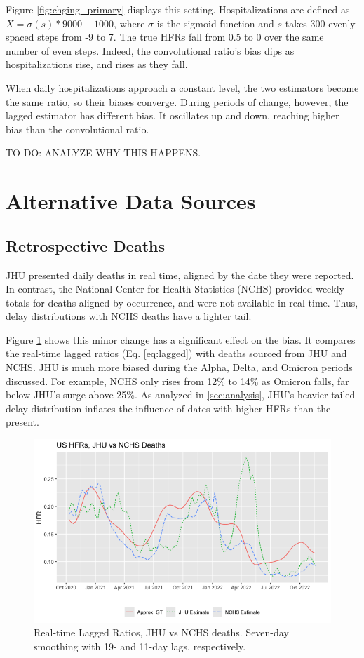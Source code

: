 \documentclass{article}
\begin{document}
Figure \ref{fig:chging_primary} displays this setting. Hospitalizations are defined as $X = \sigma(s)*9000+1000$, where $\sigma$ is the sigmoid function and $s$ takes 300 evenly spaced steps from -9 to 7. The true HFRs fall from 0.5 to 0 over the same number of even steps. Indeed, the convolutional ratio's bias dips as hospitalizations rise, and rises as they fall. 

When daily hospitalizations approach a constant level, the two estimators become the same ratio, so their biases converge. During periods of change, however, the lagged estimator has different bias. It oscillates up and down, reaching higher bias than the convolutional ratio. 

TO DO: ANALYZE WHY THIS HAPPENS.

\section{Alternative Data Sources}
\subsection{Retrospective Deaths}\label{apx:NCHS_deaths}

JHU presented daily deaths in real time, aligned by the date they were reported. In contrast, the National Center for Health Statistics (NCHS) provided weekly totals for deaths aligned by occurrence, and were not available in real time. Thus, delay distributions with NCHS deaths have a lighter tail. 

Figure \ref{fig:jhu_vs_nchs} shows this minor change has a significant effect on the bias. It compares the real-time lagged ratios (Eq. \ref{eq:lagged}) with deaths sourced from JHU and NCHS. JHU is much more biased during the Alpha, Delta, and Omicron periods discussed. For example, NCHS only rises from 12\% to 14\% as Omicron falls, far below JHU's surge above 25\%. As analyzed in \ref{sec:analysis}, JHU's heavier-tailed delay distribution inflates the influence of dates with higher HFRs than the present.


\begin{figure}
    \centering
    \includegraphics[width=0.7\linewidth]{Figs/jhu_vs_nchs.png}
    \caption{Real-time Lagged Ratios, JHU vs NCHS deaths. Seven-day smoothing with 19- and 11-day lags, respectively.}
    \label{fig:jhu_vs_nchs}
\end{figure}
\end{document}
